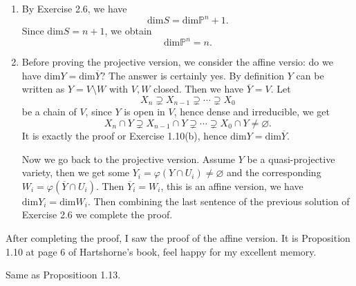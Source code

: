   \begin{solution}
    \begin{enumerate}
      \item  
      By Exercise 2.6, we have
          \[
     \mathrm{dim}S = \mathrm{dim}\mathbb{P}^{n}+1.
          \] 
   Since $\mathrm{dim}S=n+1$, we obtain
          \[
     \mathrm{dim}\mathbb{P}^{n}=n.
        \]
      \item Before proving the projective version, we consider the affine versio: do we have $\mathrm{dim}Y=\mathrm{dim}\overline{Y}$? The answer is certainly yes. By definition $Y$ can be written as $Y=V\setminus W$ with $V,W$ closed. Then we have $\overline{Y}=V$. Let 
	\[
	X_n\supsetneq X_{n-1}\supsetneq \cdots\supsetneq X_0
	\] 
	be a chain of $V$, since  $Y$ is open in $V$, hence dense and irreducible, we get
	\[
	  X_n\cap Y\supsetneq X_{n-1}\cap Y\supsetneq \cdots\supsetneq X_0\cap Y\neq \varnothing.
	\] 
	It is exactly the proof or Exercise 1.10(b), hence $\mathrm{dim}Y=\mathrm{dim}\overline{Y}$.
	
	Now we go back to the projective version. Assume $Y$ be a quasi-projective variety, then we get some $Y_i=\varphi\left( Y\cap U_i \right) \neq\varnothing$ and the corresponding  $W_i=\varphi\left( \overline{Y}\cap U_i \right) $. Then $\overline{Y}_i= W_i$, this is an affine version, we have $\mathrm{dim}Y_i=\mathrm{dim}W_i$. Then combining the last sentence of the previous solution of Exercise 2.6 we complete the proof.
    \end{enumerate}
  \end{solution}
  \begin{remark}
    After completing the proof, I saw the proof of the affine version. It is Proposition 1.10 at page 6 of Hartshorne's book, feel happy for my excellent memory.
  \end{remark}
  \begin{solution}
    Same as Propositioon 1.13.
  \end{solution}
